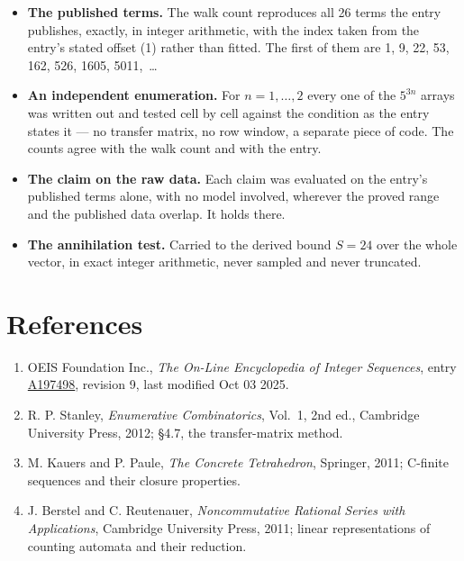 \documentclass[11pt]{article}
\theoremstyle{definition}
\begin{document}
\begin{itemize}

\item {\bfseries The published terms.} The walk count reproduces all 26 terms the entry publishes, exactly, in integer arithmetic, with the index taken from the entry's stated offset (1) rather than fitted. The first of them are 1, 9, 22, 53, 162, 526, 1605, 5011,~\dots

\item {\bfseries An independent enumeration.} For $n = 1,\dots,2$ every one of the $5^{3n}$ arrays was written out and tested cell by cell against the condition as the entry states it --- no transfer matrix, no row window, a separate piece of code. The counts agree with the walk count and with the entry.

\item {\bfseries The claim on the raw data.} Each claim was evaluated on the entry's published terms alone, with no model involved, wherever the proved range and the published data overlap. It holds there.

\item {\bfseries The annihilation test.} Carried to the derived bound $S = 24$ over the whole vector, in exact integer arithmetic, never sampled and never truncated.

\end{itemize}

\section{References}

\begin{enumerate}

\item OEIS Foundation Inc., \emph{The On-Line Encyclopedia of Integer Sequences}, entry \href{https://oeis.org/A197498}{A197498}, revision 9, last modified Oct 03 2025.

\item R. P. Stanley, \emph{Enumerative Combinatorics}, Vol.~1, 2nd ed., Cambridge University Press, 2012; \S4.7, the transfer-matrix method.

\item M. Kauers and P. Paule, \emph{The Concrete Tetrahedron}, Springer, 2011; C-finite sequences and their closure properties.

\item J. Berstel and C. Reutenauer, \emph{Noncommutative Rational Series with Applications}, Cambridge University Press, 2011; linear representations of counting automata and their reduction.

\end{enumerate}
\end{document}
